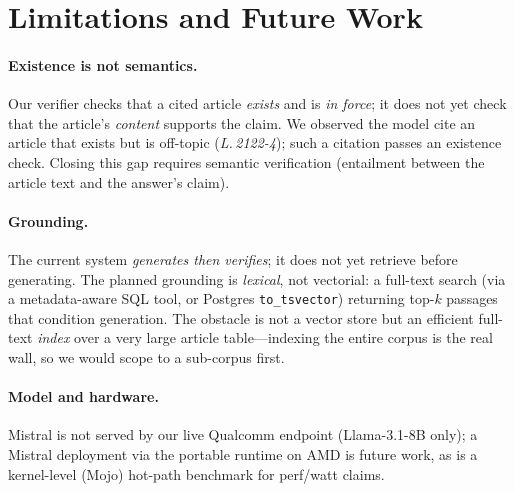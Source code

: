 \section{Limitations and Future Work}
\label{sec:limits}

\paragraph{Existence is not semantics.}
Our verifier checks that a cited article \emph{exists} and is \emph{in force};
it does not yet check that the article's \emph{content} supports the claim.
We observed the model cite an article that exists but is off-topic
(\emph{L.\,2122-4}); such a citation passes an existence check. Closing this
gap requires semantic verification (entailment between the article text and the
answer's claim).

\paragraph{Grounding.}
The current system \emph{generates then verifies}; it does not yet retrieve
before generating. The planned grounding is \emph{lexical}, not vectorial: a
full-text search (via a metadata-aware SQL tool, or Postgres
\texttt{to\_tsvector}) returning top-$k$ passages that condition generation.
The obstacle is not a vector store but an efficient full-text \emph{index}
over a very large article table---indexing the entire corpus is the real wall,
so we would scope to a sub-corpus first.

\paragraph{Model and hardware.}
Mistral is not served by our live Qualcomm endpoint (Llama-3.1-8B only); a
Mistral deployment via the portable runtime on AMD is future work, as is a
kernel-level (Mojo) hot-path benchmark for perf/watt claims.
